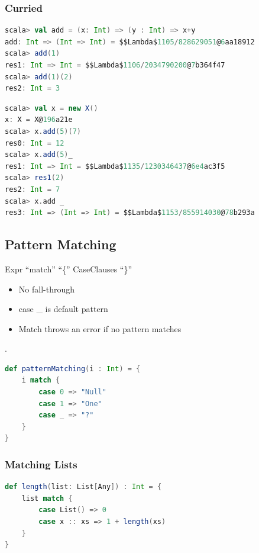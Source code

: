 \hypertarget{curried}{%
\subsubsection{Curried}\label{curried}}

\begin{lstlisting}[language=scala,mathescape=false]
scala> val add = (x: Int) => (y : Int) => x+y
add: Int => (Int => Int) = $$Lambda$1105/828629051@6aa18912
scala> add(1)
res1: Int => Int = $$Lambda$1106/2034790200@7b364f47
scala> add(1)(2)
res2: Int = 3
\end{lstlisting}

\begin{lstlisting}[language=scala,mathescape=false]
scala> val x = new X()
x: X = X@196a21e
scala> x.add(5)(7)
res0: Int = 12
scala> x.add(5)_
res1: Int => Int = $$Lambda$1135/1230346437@6e4ac3f5
scala> res1(2)
res2: Int = 7
scala> x.add _
res3: Int => (Int => Int) = $$Lambda$1153/855914030@78b293a
\end{lstlisting}

\hypertarget{pattern-matching}{%
\subsection{Pattern Matching}\label{pattern-matching}}

Expr ``match'' ``\{'' CaseClauses ``\}''

\begin{itemize}
\tightlist
\item
  No fall-through
\item
  case \_ is default pattern
\item
  Match throws an error if no pattern matches
\end{itemize}

.

\begin{lstlisting}[language=scala]
def patternMatching(i : Int) = {
    i match {
        case 0 => "Null"
        case 1 => "One"
        case _ => "?"
    }
}
\end{lstlisting}

\hypertarget{matching-lists}{%
\subsubsection{Matching Lists}\label{matching-lists}}

\begin{lstlisting}[language=scala]
def length(list: List[Any]) : Int = {
    list match {
        case List() => 0
        case x :: xs => 1 + length(xs)
    }
}
\end{lstlisting}

